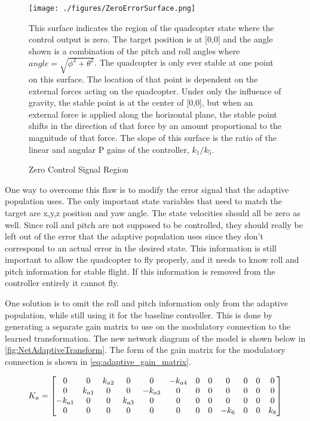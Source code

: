 \documentclass[letterpaper,12pt,titlepage,oneside,final]{book}
\begin{document}
\begin{figure}
\centering
\texttt{[image: ./figures/ZeroErrorSurface.png]} %
\caption{Zero Control Signal Region}
\label{fig:ZeroErrorSurface}
\medskip
\small %
This surface indicates the region of the quadcopter state where the control output is zero.
The target position is at [0,0] and the angle shown is a combination of the pitch and roll angles where $angle = \sqrt{\phi^{2} + \theta^{2}}$.
The quadcopter is only ever stable at one point on this surface.
The location of that point is dependent on the external forces acting on the quadcopter.
Under only the influence of gravity, the stable point is at the center of [0,0], but when an external force is applied along the horizontal plane, the stable point shifts in the direction of that force by an amount proportional to the magnitude of that force.
The slope of this surface is the ratio of the linear and angular P gains of the controller, $k_{1}/k_{5}$.
\end{figure}


One way to overcome this flaw is to modify the error signal that the adaptive population uses. 
The only important state variables that need to match the target are x,y,z position and yaw angle. 
The state velocities should all be zero as well. 
Since roll and pitch are not supposed to be controlled, they should really be left out of the error that the adaptive population uses since they don't correspond to an actual error in the desired state. 
This information is still important to allow the quadcopter to fly properly, and it needs to know roll and pitch information for stable flight. If this information is removed from the controller entirely it cannot fly.

One solution is to omit the roll and pitch information only from the adaptive population, while still using it for the baseline controller. 
This is done by generating a separate gain matrix to use on the modulatory connection to the learned transformation. 
The new network diagram of the model is shown below in \autoref{fig:NetAdaptiveTransform}. 
The form of the gain matrix for the modulatory connection is shown in \autoref{eq:adaptive_gain_matrix}.

\begin{equation} \label{eq:adaptive_gain_matrix}
K_{a} =
\setcounter{MaxMatrixCols}{12}
\begin{bmatrix}
0 & 0 & k_{a2} & 0 & 0 & -k_{a4} & 0 & 0 & 0 & 0 & 0 & 0 \\
0 & k_{a1} & 0 & 0 & -k_{a3} & 0 & 0 & 0 & 0 & 0 & 0 & 0 \\
-k_{a1} & 0 & 0 & k_{a3} & 0 & 0 & 0 & 0 & 0 & 0 & 0 & 0 \\
0 & 0 & 0 & 0 & 0 & 0 & 0 & 0 & -k_{6} & 0 & 0 & k_{8}
\end{bmatrix}
\end{equation}
\end{document}
